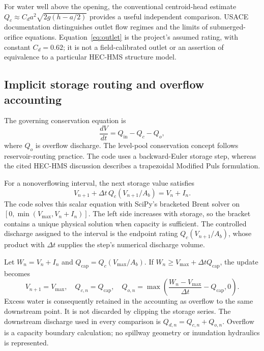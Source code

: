 \documentclass[11pt,letterpaper]{article}
\begin{document}
For water well above the opening, the conventional centroid-head estimate
$Q_c\approx C_d a^2\sqrt{2g(h-a/2)}$ provides a useful independent comparison.
USACE documentation distinguishes outlet flow regimes and the limits of
submerged-orifice equations.\cite{outlet}
Equation~\eqref{eq:outlet} is the project's assumed rating, with constant
$C_d=0.62$; it is not a field-calibrated outlet or an assertion of equivalence
to a particular HEC-HMS structure model.

\subsection{Implicit storage routing and overflow accounting}
The governing conservation equation is
\begin{equation}
 \frac{dV}{dt}=Q_{\mathrm{in}}-Q_c-Q_o,
 \label{eq:continuity}
\end{equation}
where $Q_o$ is overflow discharge. The level-pool conservation concept follows
reservoir-routing practice.\cite{routing} The code uses a backward-Euler
storage step, whereas the cited HEC-HMS discussion describes a trapezoidal
Modified Puls formulation.

For a nonoverflowing interval, the next storage value satisfies
\begin{equation}
 V_{n+1}+\Delta t\,Q_c(V_{n+1}/A_b)=V_n+I_n.
 \label{eq:implicit}
\end{equation}
The code solves this scalar equation with SciPy's bracketed Brent solver
on $[0,\min(V_{\max},V_n+I_n)]$. The left side increases with storage, so
the bracket contains a unique physical solution when capacity is sufficient.
The controlled discharge assigned to the interval is the endpoint rating
$Q_c(V_{n+1}/A_b)$, whose product with $\Delta t$ supplies the step's
numerical discharge volume.

Let $W_n=V_n+I_n$ and $Q_{\mathrm{cap}}=Q_c(V_{\max}/A_b)$. If
$W_n\geq V_{\max}+\Delta t Q_{\mathrm{cap}}$, the update becomes
\begin{equation}
 V_{n+1}=V_{\max},\quad Q_{c,n}=Q_{\mathrm{cap}},\quad
 Q_{o,n}=\max\!\left(\frac{W_n-V_{\max}}{\Delta t}-Q_{\mathrm{cap}},0\right).
 \label{eq:overflow}
\end{equation}
Excess water is consequently retained in the accounting as overflow to the
same downstream point. It is not discarded by clipping the storage series.
The downstream discharge used in every comparison is
$Q_{d,n}=Q_{c,n}+Q_{o,n}$. Overflow is a capacity boundary calculation; no
spillway geometry or inundation hydraulics is represented.
\end{document}
